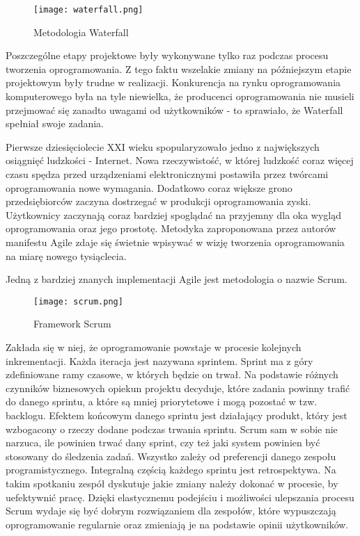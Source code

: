 \begin{figure}[htbp]
    \centering
    \texttt{[image: waterfall.png]}
    \caption{Metodologia Waterfall}
    \label{fig:waterfall}
\end{figure}
Poszczególne etapy projektowe były wykonywane tylko raz podczas procesu tworzenia oprogramowania. Z tego faktu wszelakie zmiany na późniejszym etapie projektowym były trudne w realizacji. Konkurencja na rynku oprogramowania komputerowego była na tyle niewielka, że producenci oprogramowania nie musieli przejmować się zanadto uwagami od użytkowników - to sprawiało, że Waterfall spełniał swoje zadania. 
\par
Pierwsze dziesięciolecie XXI wieku spopularyzowało jedno z największych osiągnięć ludzkości - Internet. Nowa rzeczywistość, w której ludzkość coraz więcej czasu spędza przed urządzeniami elektronicznymi postawiła przez twórcami oprogramowania nowe wymagania. Dodatkowo coraz większe grono przedsiębiorców zaczyna dostrzegać w produkcji oprogramowania zyski. Użytkownicy zaczynają coraz bardziej spoglądać na przyjemny dla oka wygląd oprogramowania oraz jego prostotę. Metodyka zaproponowana przez autorów manifestu Agile zdaje się świetnie wpisywać w wizję tworzenia oprogramowania na miarę nowego tysiąclecia.
\par
Jedną z bardziej znanych implementacji Agile jest metodologia o nazwie Scrum.
\begin{figure}[htbp]
    \centering
    \texttt{[image: scrum.png]}
    \caption{Framework Scrum}
    \label{fig:scrum}
\end{figure}
Zakłada się w niej, że oprogramowanie powstaje w procesie kolejnych inkrementacji. Każda iteracja jest nazywana sprintem. Sprint ma z góry zdefiniowane ramy czasowe, w których będzie on trwał. Na podstawie różnych czynników biznesowych opiekun projektu decyduje, które zadania powinny trafić do danego sprintu, a które są mniej priorytetowe i mogą pozostać w tzw. backlogu. Efektem końcowym danego sprintu jest działający produkt, który jest wzbogacony o rzeczy dodane podczas trwania sprintu. Scrum sam w sobie nie narzuca, ile powinien trwać dany sprint, czy też jaki system powinien być stosowany do śledzenia zadań. Wszystko zależy od preferencji danego zespołu programistycznego. Integralną częścią każdego sprintu jest retrospektywa. Na takim spotkaniu zespół dyskutuje jakie zmiany należy dokonać w procesie, by uefektywnić pracę. Dzięki elastycznemu podejściu i możliwości ulepszania procesu Scrum wydaje się być dobrym rozwiązaniem dla zespołów, które wypuszczają oprogramowanie regularnie oraz zmieniają je na podstawie opinii użytkowników.
